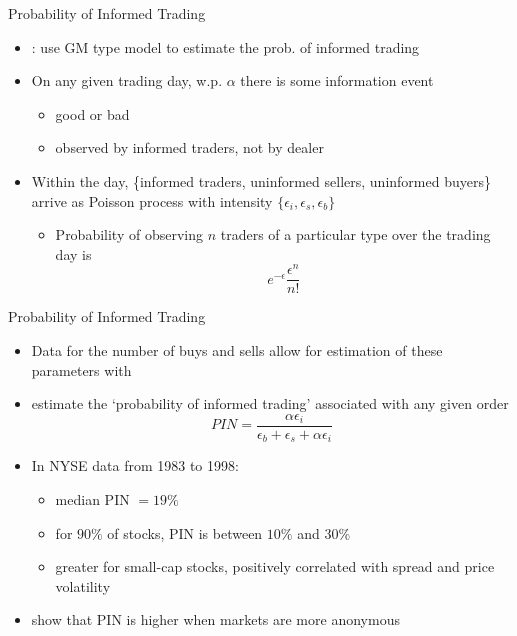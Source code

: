 \documentclass[english,10pt
,aspectratio=169
]{beamer}
\begin{document}
\begin{frame}{Probability of Informed Trading}
	\begin{itemize}
		\item \textbf{\citet*{easley_liquidity_1996}}: use GM type model to estimate the prob. of informed trading
		\item On any given trading day, w.p. $\alpha$ there is some information event
		\begin{itemize}
			\item good or bad
			\item observed by informed traders, not by dealer
		\end{itemize}
		\item Within the day, \{informed traders, uninformed sellers, uninformed buyers\} arrive as Poisson process with intensity $\{\epsilon_i, \epsilon_s, \epsilon_b \}$
		\begin{itemize}
			\item Probability of observing $n$ traders of a particular type over the trading day is
			\[
			e^{-\epsilon} \frac{\epsilon^n}{n!}
			\]
		\end{itemize}
	\end{itemize}
\end{frame}


\begin{frame}{Probability of Informed Trading}
	\begin{itemize}
		\item Data for the number of buys and sells allow for estimation of these parameters with 
		\item \textbf{\citet*{easley_is_2002}} estimate the `probability of informed trading' associated with any given order
		\begin{equation} \tag{5.27}
		PIN = \frac{\alpha \epsilon_i}{\epsilon_b + \epsilon_s + \alpha \epsilon_i}
		\end{equation}
		\item In NYSE data from 1983 to 1998:
		\begin{itemize}
			\item median PIN $=19\%$
			\item for $90\%$ of stocks, PIN is between $10\%$ and $30\%$
			\item greater for small-cap stocks, positively correlated with spread and price volatility
		\end{itemize}
		\item \textbf{\citet*{grammig_knowing_2001}} show that PIN is higher when markets are more anonymous
	\end{itemize}
\end{frame}
\end{document}
